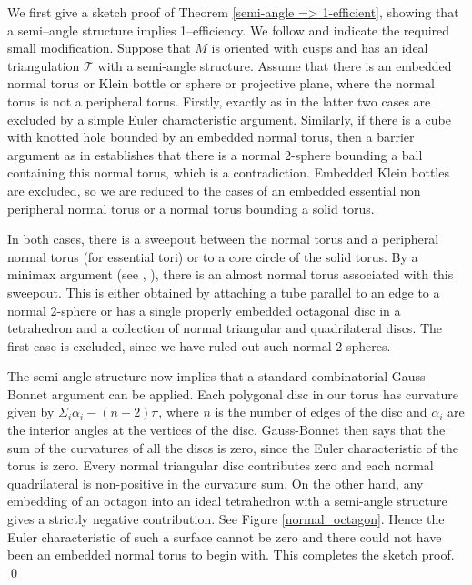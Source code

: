 \documentclass[12pt]{amsart}
\theoremstyle{definition}
\theoremstyle{remark}
\def\tri{\mathcal{T}}
\begin{document}
We first give a sketch proof of Theorem \ref{semi-angle => 1-efficient}, showing that a semi--angle structure implies 1--efficiency. We follow \cite{KR2} and indicate the required small modification. Suppose that
$M$ is oriented with cusps and has an ideal triangulation $\tri$ with a semi-angle structure. Assume that there is an embedded normal torus or Klein bottle or sphere or projective plane, where the normal torus is not a peripheral torus.  Firstly, exactly as in \cite{Lackenby} the latter two cases are excluded by a simple Euler characteristic argument. 
Similarly, if there is a cube with knotted hole bounded by an embedded normal torus, then a barrier argument as in \cite{JR} establishes that there is a normal 2-sphere bounding a ball containing this normal torus, which is a contradiction. Embedded Klein bottles are excluded, so we are reduced to the cases of an embedded essential non peripheral normal torus or a normal torus bounding a solid torus. 

In both cases, there is a sweepout between the normal torus and a peripheral normal torus (for essential tori) or to a core circle of the solid torus. 
By a minimax argument (see \cite{Rub}, \cite{Sto}), there is an almost normal torus associated with this sweepout. This is either obtained by attaching a tube parallel to an edge to a normal 2-sphere or has a single properly embedded octagonal disc in a tetrahedron and a collection of normal triangular and quadrilateral discs. 
The first case is excluded, since we have ruled out such normal 2-spheres. 

The semi-angle structure now implies that a standard combinatorial Gauss-Bonnet argument can be applied. Each polygonal disc in our torus has curvature given by $\Sigma_i \alpha_i  - (n-2)\pi$, where $n$ is the number of edges of the disc and $\alpha_i$ are the interior angles at the vertices of the disc. Gauss-Bonnet then says that the sum of the curvatures of all the discs is zero, since the Euler characteristic of the torus is zero. Every normal triangular disc contributes zero and each normal quadrilateral is non-positive in the curvature sum. On the other hand, any embedding of an octagon into an ideal tetrahedron with a semi-angle structure gives a strictly negative contribution. See Figure \ref{normal_octagon}. Hence the Euler characteristic of such a surface cannot be zero and there could not have been an embedded normal torus to begin with. This completes the sketch proof. 
\qed
\end{document}
